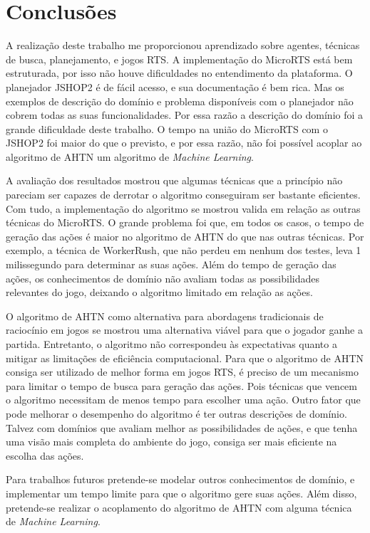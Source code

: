 
\chapter{\label{chap:concl}Conclusões}

A realização deste trabalho me proporcionou aprendizado sobre agentes, técnicas de busca, planejamento, e jogos RTS.
A implementação do MicroRTS está bem estruturada, por isso não houve dificuldades no entendimento da plataforma.
O planejador JSHOP2 é de fácil acesso, e sua documentação é bem rica.
Mas os exemplos de descrição do domínio e problema disponíveis com o planejador não cobrem todas as suas funcionalidades.
Por essa razão a descrição do domínio foi a grande dificuldade deste trabalho.
O tempo na união do MicroRTS com o JSHOP2 foi maior do que o previsto, e por essa razão, não foi possível acoplar ao algoritmo de AHTN um algoritmo de \textit{Machine Learning}.

A avaliação dos resultados mostrou que algumas técnicas que a princípio não pareciam ser capazes de derrotar o algoritmo conseguiram ser bastante eficientes.
Com tudo, a implementação do algoritmo se mostrou valida em relação as outras técnicas do MicroRTS.
O grande problema foi que, em todos os casos, o tempo de geração das ações é maior no algoritmo de AHTN do que nas outras técnicas.
Por exemplo, a técnica de WorkerRush, que não perdeu em nenhum dos testes, leva 1 milissegundo para determinar as suas ações.
Além do tempo de geração das ações, os conhecimentos de domínio não avaliam todas as possibilidades relevantes do jogo, deixando o algoritmo limitado em relação as ações.

O algoritmo de AHTN como alternativa para abordagens tradicionais de raciocínio em jogos se mostrou uma alternativa viável para que o jogador ganhe a partida.
Entretanto, o algoritmo não correspondeu às expectativas quanto a mitigar as limitações de eficiência computacional.
Para que o algoritmo de AHTN consiga ser utilizado de melhor forma em jogos RTS, é preciso de um mecanismo para limitar o tempo de busca para geração das ações.
Pois técnicas que vencem o algoritmo necessitam de menos tempo para escolher uma ação.
Outro fator que pode melhorar o desempenho do algoritmo é ter outras descrições de domínio.
Talvez com domínios que avaliam melhor as possibilidades de ações, e que tenha uma visão mais completa do ambiente do jogo, consiga ser mais eficiente na escolha das ações. 

Para trabalhos futuros pretende-se modelar outros conhecimentos de domínio, e implementar um tempo limite para que o algoritmo gere suas ações. 
Além disso, pretende-se realizar o acoplamento do algoritmo de AHTN com alguma técnica de \textit{Machine Learning}.
